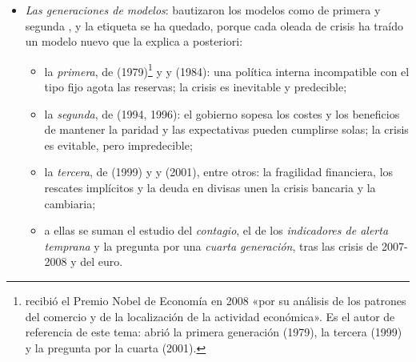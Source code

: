\documentclass[11pt]{article}
\begin{document}
\begin{itemize}
\begin{itemize}
    \begin{itemize}
    \item el fin de Bretton Woods (1971-1973) ;
    \item la crisis de la deuda latinoamericana (1982), el Sistema Monetario Europeo (1992-1993), México (1994), Asia (1997), Rusia (1998) y Argentina (2001-2002) ;
    \item la crisis financiera global (2007-2008) y la de la zona del euro (2010-2012)  .
    \end{itemize}
  \item \emph{Las generaciones de modelos}: \textcite{ERW1995Mayhem} bautizaron los modelos como de primera y segunda , y la etiqueta se ha quedado, porque cada oleada de crisis ha traído un modelo nuevo que la explica a posteriori\nocite{Krugman2001Next}:
    \begin{itemize}
    \item la \emph{primera}, de  (1979)\footnote{ recibió el Premio Nobel de Economía en 2008 «por su análisis de los patrones del comercio y de la localización de la actividad económica»\nocite{Nobel2008Krugman}. Es el autor de referencia de este tema: abrió la primera generación (1979), la tercera (1999) y la pregunta por la cuarta (2001).} y  y  (1984)\nocite{Krugman1979Model,FloodGarber1984}: una política interna incompatible con el tipo fijo agota las reservas; la crisis es inevitable y predecible;
    \item la \emph{segunda}, de  (1994, 1996)\nocite{Obstfeld1994Logic,Obstfeld1996}: el gobierno sopesa los costes y los beneficios de mantener la paridad y las expectativas pueden cumplirse solas; la crisis es evitable, pero impredecible;
    \item la \emph{tercera}, de  (1999) y  y  (2001), entre otros\nocite{Krugman1999Balance,ChangVelasco2001Model}: la fragilidad financiera, los rescates implícitos y la deuda en divisas unen la crisis bancaria y la cambiaria;
    \item a ellas se suman el estudio del \emph{contagio}, el de los \emph{indicadores de alerta temprana} y la pregunta por una \emph{cuarta generación}, tras las crisis de 2007-2008 y del euro.
    \end{itemize}
  \end{itemize}
\end{itemize}
\end{document}
